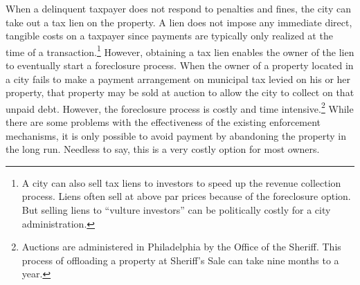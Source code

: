 \documentclass[12pt]{article}
\begin{document}
When a delinquent taxpayer does not respond to penalties and fines,
the city can take out a tax lien on the property.  A lien does not
impose any immediate direct, tangible costs on a  taxpayer
since payments are typically only realized at the time of a
transaction.\footnote{A city can also sell tax liens to investors to
  speed up the revenue collection process. Liens often sell at above
  par prices because of the foreclosure option. But selling liens to
  ``vulture investors'' can be politically costly for a city
  administration.}  However, obtaining a tax lien enables the owner of
the lien to eventually start a foreclosure process. When the owner of
a property located in a city fails to make a payment arrangement on
municipal tax levied on his or her property, that property may be
sold at auction to allow the city to collect on that unpaid debt.
However, the foreclosure process is costly and time
intensive.\footnote{Auctions are administered in Philadelphia by the
  Office of the Sheriff.  This process of offloading a property at
  Sheriff's Sale can take nine months to a year.}  While there are
some problems with the effectiveness of the existing enforcement
mechanisms, it is only possible to avoid payment by abandoning the
property in the long run. Needless to say, this is a very costly
option for most owners.
\end{document}
